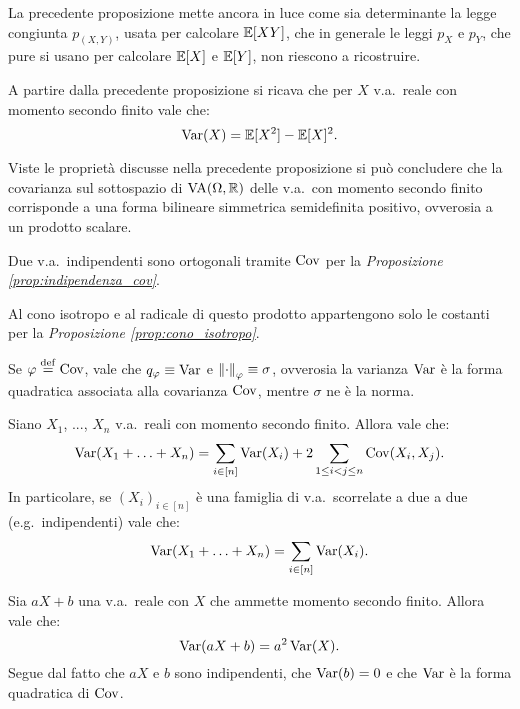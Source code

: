 \begin{multicols*}{2}
\begin{remark}
    La precedente proposizione mette ancora in luce come sia determinante la
    legge congiunta $p_{(X, Y)}$, usata per calcolare $\mathbb{E}[XY]$, che
    in generale le leggi $p_X$ e $p_Y$, che pure si usano per calcolare
    $\mathbb{E}[X]$ e $\mathbb{E}[Y]$, non riescono a ricostruire.
\end{remark}

\begin{remark}
    A partire dalla precedente proposizione si ricava che per $X$ v.a.~reale
    con momento secondo finito vale che:
    \[
        \operatorname{Var}(X) = \mathbb{E}[X^2] - \mathbb{E}[X]^2.
    \]
\end{remark}

\begin{remark}
    Viste le proprietà discusse nella precedente proposizione
    si può concludere che la covarianza sul sottospazio di $\operatorname{VA}(\Omega, \mathbb{R})$
    delle v.a.~con momento secondo finito
    corrisponde a una forma bilineare simmetrica semidefinita positivo,
    ovverosia a un prodotto scalare. \smallskip


    Due v.a.~indipendenti sono ortogonali tramite $\operatorname{Cov}$ per la
    \textit{Proposizione \ref{prop:indipendenza_cov}}. \smallskip

    Al cono isotropo e al radicale di questo prodotto appartengono solo le costanti per la
    \textit{Proposizione \ref{prop:cono_isotropo}}. \smallskip


    Se $\varphi \overset{\mathrm{def}}{=} \operatorname{Cov}$, vale che $q_\varphi \equiv \operatorname{Var}$ e $\left\lVert \cdot \right\rVert_\varphi \equiv \sigma$,
    ovverosia la varianza $\operatorname{Var}$ è la forma quadratica associata alla covarianza $\operatorname{Cov}$,
    mentre $\sigma$ ne è la norma.
\end{remark}

\begin{lemma}
    Siano $X_1$, ..., $X_n$ v.a.~reali con momento secondo finito. Allora vale che:
    \[
        \operatorname{Var}(X_1 + \ldots + X_n) = \sum_{i \in [n]} \operatorname{Var}(X_i) + 2 \sum_{1 \leq i < j \leq n} \operatorname{Cov}(X_i, X_j).
    \]
    In particolare, se $(X_i)_{i \in [n]}$ è una famiglia di v.a.~scorrelate a due a due (e.g.~indipendenti) vale che:
    \[
        \operatorname{Var}(X_1 + \ldots + X_n) = \sum_{i \in [n]} \operatorname{Var}(X_i).
    \]
\end{lemma}

\begin{lemma}
    Sia $aX + b$ una v.a.~reale con $X$ che ammette momento secondo finito. Allora
    vale che:
    \[
        \operatorname{Var}(aX + b) = a^2 \operatorname{Var}(X).
    \]
    Segue dal fatto che $aX$ e $b$ sono indipendenti, che $\operatorname{Var}(b) = 0$ e che
    $\operatorname{Var}$ è la forma quadratica di $\operatorname{Cov}$.
\end{lemma}


\end{multicols*}
